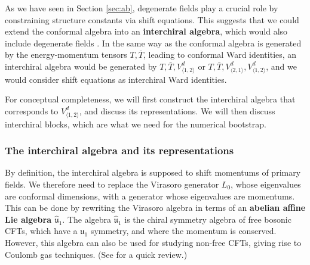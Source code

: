 \documentclass[12pt, a4paper]{article}
\newcommand{\myindex}[1]{\textbf{\boldmath #1}}
\theoremstyle{break}
\begin{document}
As we have seen in Section \ref{sec:ab}, degenerate fields play a crucial role by constraining structure constants via shift equations. This suggests that we could extend the conformal algebra into an  \myindex{interchiral algebra}, which would also include degenerate fields \cite{grs12}. In the same way as the conformal algebra is generated by the energy-momentum tensors $T,\bar T$, leading to conformal Ward identities, an interchiral algebra would be generated by $T,\bar T,V^d_{\langle 1,2\rangle}$ or $T,\bar T,V^d_{\langle 2,1\rangle},V^d_{\langle 1,2\rangle}$, and we would consider shift equations as interchiral Ward identities. 

For conceptual completeness, we will first construct the interchiral algebra that corresponds to $V^d_{\langle 1,2\rangle}$, and discuss its representations. We will then discuss interchiral blocks, which are what we need for the numerical bootstrap.

\subsubsection{The interchiral algebra and its representations}

By definition, the interchiral algebra is supposed to shift momentums of primary fields. We therefore need to replace the Virasoro generator $L_0$, whose eigenvalues are conformal dimensions, with a generator whose eigenvalues are momentums. This can be done by rewriting the Virasoro algebra in terms of an \myindex{abelian affine Lie algebra $\hat{\mathfrak{u}}_1$}. The algebra $\hat{\mathfrak{u}}_1$ is the chiral symmetry algebra of free bosonic CFTs, which have a $\mathfrak{u}_1$ symmetry, and where the momentum is conserved. 
However, this algebra can also be used for studying non-free CFTs, giving rise to Coulomb gas techniques. (See \cite[Section 4.1]{rib14} for a quick review.)
\end{document}
